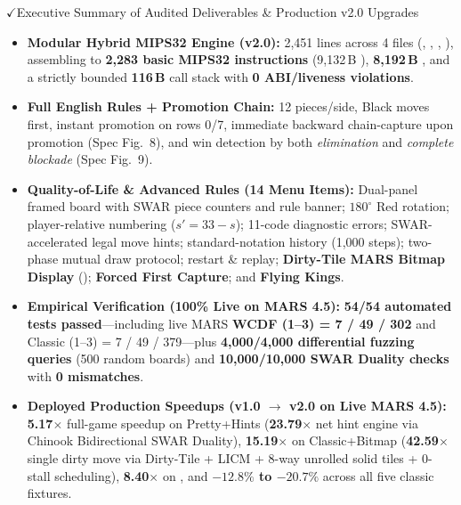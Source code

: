 \begin{keybox}{$\checkmark$\hspace{0.45em}Executive Summary of Audited Deliverables \& Production v2.0 Upgrades}
\footnotesize
\begin{itemize}[topsep=1pt,itemsep=1.5pt]
    \item \textbf{Modular Hybrid MIPS32 Engine (v2.0):} 2,451 lines across 4 files (, , , ), assembling to \textbf{2,283 basic MIPS32 instructions} (9,132\,B ), \textbf{8,192\,B} , and a strictly bounded \textbf{116\,B} call stack with \textbf{0 ABI/liveness violations}.
    \item \textbf{Full English Rules + Promotion Chain:} 12 pieces/side, Black moves first, instant promotion on rows 0/7, immediate backward chain-capture upon promotion (Spec Fig.~8), and win detection by both \emph{elimination} and \emph{complete blockade} (Spec Fig.~9).
    \item \textbf{Quality-of-Life \& Advanced Rules (14 Menu Items):} Dual-panel framed board with SWAR  piece counters and rule banner; $180^\circ$ Red rotation; player-relative numbering ($s' = 33 - s$); 11-code diagnostic errors; SWAR-accelerated legal move hints; standard-notation history (1,000 steps); two-phase mutual draw protocol; restart \& replay; \textbf{Dirty-Tile MARS Bitmap Display} (); \textbf{Forced First Capture}; and \textbf{Flying Kings}.
    \item \textbf{Empirical Verification (100\% Live on MARS 4.5):} \textbf{54/54 automated  tests passed}---including live MARS \textbf{WCDF (1--3) = 7 / 49 / 302} and Classic (1--3) = 7 / 49 / 379---plus \textbf{4,000/4,000 differential fuzzing queries} (500 random boards) and \textbf{10,000/10,000 SWAR Duality checks} with \textbf{0 mismatches}.
    \item \textbf{Deployed Production Speedups (v1.0 $\to$ v2.0 on Live MARS 4.5):} \textbf{5.17$\times$} full-game speedup on Pretty+Hints (\textbf{23.79$\times$} net hint engine via Chinook Bidirectional SWAR Duality), \textbf{15.19$\times$} on Classic+Bitmap (\textbf{42.59$\times$} single dirty move via Dirty-Tile + LICM + 8-way unrolled solid tiles + 0-stall scheduling), \textbf{8.40$\times$} on , and \textbf{$-12.8\%$ to $-20.7\%$} across all five classic fixtures.
\end{itemize}
\end{keybox}


